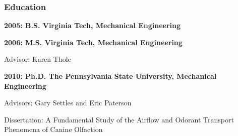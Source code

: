 \subsubsection*{\large{Education}}
\vspace{-0.15in}

\textbf{2005: B.S. Virginia Tech, Mechanical Engineering}
\vspace{-0.1in}

\textbf{2006: M.S. Virginia Tech, Mechanical Engineering}

\vspace{-0.1in}
\hspace*{0.2in}Advisor: Karen Thole
\vspace{-0.1in}

\textbf{2010: Ph.D. The Pennsylvania State University, Mechanical Engineering}

\vspace{-0.1in}
\hspace*{0.2in}Advisors: Gary Settles and Eric Paterson

\vspace{-0.1in}
\hspace*{0.2in}Dissertation: A Fundamental Study of the Airflow and Odorant Transport Phenomena of Canine Olfaction

